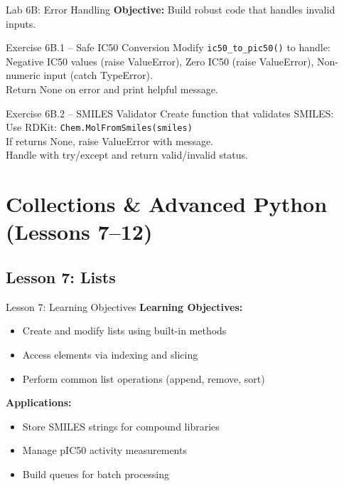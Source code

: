\documentclass{beamer}
\begin{document}
\begin{frame}{\textcolor{labcolor}{Lab 6B: Error Handling}}
    \footnotesize
    \textbf{Objective:} Build robust code that handles invalid inputs.
    \vspace{0.2em}
    \begin{block}{Exercise 6B.1 -- Safe IC50 Conversion}
        Modify \texttt{ic50\_to\_pic50()} to handle: Negative IC50 values (raise ValueError), Zero IC50 (raise ValueError), Non-numeric input (catch TypeError).\\
        Return None on error and print helpful message.
    \end{block}
    \vspace{0.2em}
    \begin{block}{Exercise 6B.2 -- SMILES Validator}
        Create function that validates SMILES:\\
        Use RDKit: \texttt{Chem.MolFromSmiles(smiles)}\\
        If returns None, raise ValueError with message.\\
        Handle with try/except and return valid/invalid status.
    \end{block}
\end{frame}

\section{Collections \& Advanced Python (Lessons 7--12)}

\subsection{Lesson 7: Lists}

\begin{frame}{Lesson 7: Learning Objectives}
    \small
    \textbf{Learning Objectives:}
    \begin{itemize}
        \item Create and modify lists using built-in methods
        \item Access elements via indexing and slicing
        \item Perform common list operations (append, remove, sort)
    \end{itemize}
    \vspace{0.5em}
    \textbf{Applications:}
    \begin{itemize}
        \item Store SMILES strings for compound libraries
        \item Manage pIC50 activity measurements
        \item Build queues for batch processing
    \end{itemize}
\end{frame}
\end{document}
